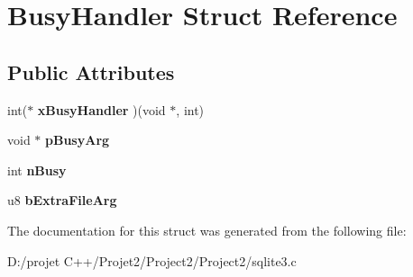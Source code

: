 \hypertarget{struct_busy_handler}{}\section{Busy\+Handler Struct Reference}
\label{struct_busy_handler}
\subsection*{Public Attributes}
\begin{DoxyCompactItemize}
\item 
\mbox{\label{struct_busy_handler_a50de3503bf2bbd10d9cd817faaeda9c5}} 
int($\ast$ {\bfseries x\+Busy\+Handler} )(void $\ast$, int)
\item 
\mbox{\label{struct_busy_handler_ad66e9e9ec748a413a7122c298b285783}} 
void $\ast$ {\bfseries p\+Busy\+Arg}
\item 
\mbox{\label{struct_busy_handler_aac4531c677ed5ae9e4757ca1b02c568b}} 
int {\bfseries n\+Busy}
\item 
\mbox{\label{struct_busy_handler_a51ada0569a07057c498ce8fd378cb04b}} 
u8 {\bfseries b\+Extra\+File\+Arg}
\end{DoxyCompactItemize}


The documentation for this struct was generated from the following file\+:\begin{DoxyCompactItemize}
\item 
D\+:/projet C++/\+Projet2/\+Project2/\+Project2/sqlite3.\+c\end{DoxyCompactItemize}
